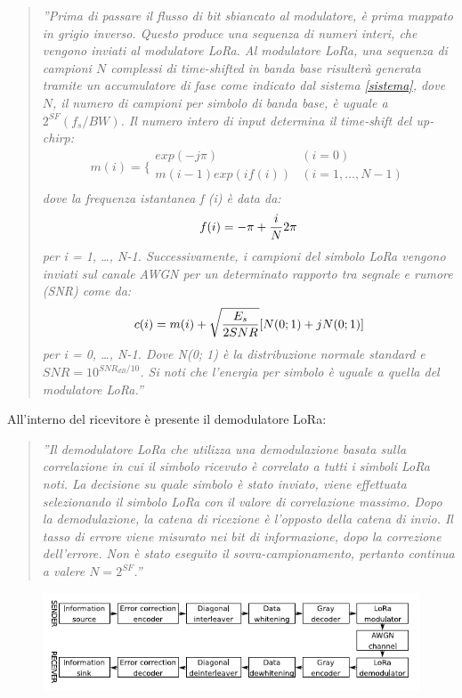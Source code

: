 \documentclass[a4paper]{report} %
\begin{document}
\begin{enumerate}
\begin{quote}	
	\textit{''Prima di passare il flusso di bit sbiancato al modulatore, è prima mappato in grigio inverso. Questo produce una sequenza di numeri interi, che vengono inviati al modulatore LoRa. Al modulatore LoRa, una sequenza di campioni $N$ complessi di time-shifted in banda base risulterà generata tramite un accumulatore di fase come indicato dal sistema \ref{sistema}, dove $N$, il numero di campioni per simbolo di banda base, è uguale a $2^{SF} (f_s / BW)$. Il numero intero di input determina il time-shift del up-chirp:
	\begin{equation}[h]
	m(i) = \bigg \{
	\begin{array}{rl}
	exp(-j\pi) & (i = 0)\\
	m(i-1)exp(if(i)) & (i = 1, \dots, N-1)\\
	\end{array} \label{sistema}
	\end{equation}
	dove la frequenza istantanea f (i) è data da:
	\begin{equation}
	f(i) = -\pi + {i \over N} 2\pi  
	\end{equation}
	per i = 1, \dots, N-1. Successivamente, i campioni del simbolo LoRa vengono inviati sul canale AWGN per un determinato rapporto tra segnale e rumore (SNR) come da:
	\begin{equation}
	c(i) = m(i) + \sqrt{E_s \over 2SNR}[N(0; 1) + jN(0; 1)]
	\end{equation}
	per i = 0, \dots, N-1. Dove N(0; 1) è la distribuzione normale standard e $SNR = 10^{SNR_{dB} / 10}$. Si noti che l'energia per simbolo è uguale a quella del modulatore LoRa.''}
\end{quote}
All'interno del ricevitore è presente il demodulatore LoRa:
\begin{quote}
	\textit{''Il demodulatore LoRa che utilizza una demodulazione basata sulla correlazione in cui il simbolo ricevuto è correlato a tutti i simboli LoRa noti. La decisione su quale simbolo è stato inviato, viene effettuata selezionando il simbolo LoRa con il valore di correlazione massimo. Dopo la demodulazione, la catena di ricezione è l'opposto della catena di invio. Il tasso di errore viene misurato nei bit di informazione, dopo la correzione dell'errore. Non è stato eseguito il sovra-campionamento, pertanto continua a valere $N = 2^{SF}$.''}
\end{quote}

\begin{figure}
\centering
\includegraphics[scale=.7]{Immagini/SchemaABlocchi.png}


\end{figure}
\end{enumerate}
\end{document}

